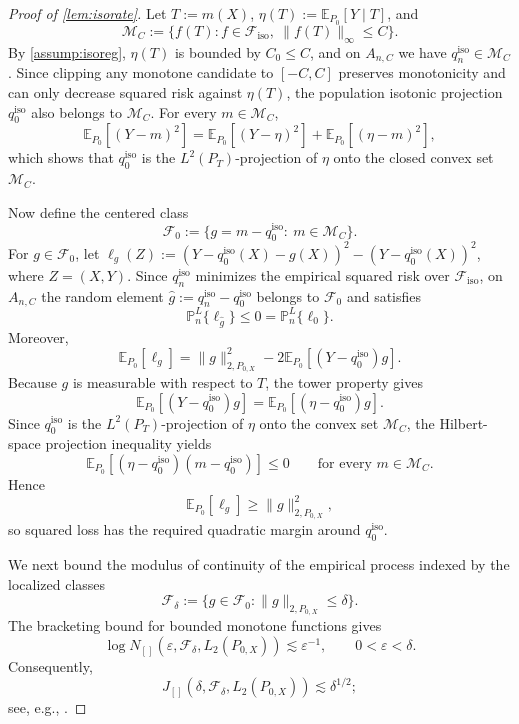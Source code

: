 \documentclass{article}
\theoremstyle{plain}
\theoremstyle{definition}
\newcommand{\E}{\mathbb{E}}
\newcommand{\1}{\mathbf{1}}
\newcommand{\mhat}{m}
\newcommand{\Pl}{\mathbb{P}^{L}_n}
\newcommand{\Px}{P_{0,X}}
\begin{document}
\begin{proof}[Proof of \cref{lem:isorate}]

Let \(T:=\mhat(X)\), \(\eta(T):=\E_{P_0}[Y\mid T]\), and
\[
\mathcal M_C:=\{f(T):f\in\mathcal F_{\mathrm{iso}},\ \|f(T)\|_\infty\le C\}.
\]
By \cref{assump:isoreg}, \(\eta(T)\) is bounded by \(C_0\le C\), and on \(A_{n,C}\) we have \(q_n^{\mathrm{iso}}\in\mathcal M_C\). Since clipping any monotone candidate to \([-C,C]\) preserves monotonicity and can only decrease squared risk against \(\eta(T)\), the population isotonic projection \(q_0^{\mathrm{iso}}\) also belongs to \(\mathcal M_C\). For every \(m\in\mathcal M_C\),
\[
\E_{P_0}[(Y-m)^2]
=
\E_{P_0}[(Y-\eta)^2]+\E_{P_0}[(\eta-m)^2],
\]
which shows that \(q_0^{\mathrm{iso}}\) is the \(L^2(P_T)\)-projection of \(\eta\) onto the closed convex set \(\mathcal M_C\).

Now define the centered class
\[
\mathcal F_0:=\{g=m-q_0^{\mathrm{iso}}:\ m\in\mathcal M_C\}.
\]
For \(g\in\mathcal F_0\), let \(\ell_g(Z):=(Y-q_0^{\mathrm{iso}}(X)-g(X))^2-(Y-q_0^{\mathrm{iso}}(X))^2\), where \(Z=(X,Y)\). Since \(q_n^{\mathrm{iso}}\) minimizes the empirical squared risk over \(\mathcal F_{\mathrm{iso}}\), on \(A_{n,C}\) the random element \(\hat g:=q_n^{\mathrm{iso}}-q_0^{\mathrm{iso}}\) belongs to \(\mathcal F_0\) and satisfies
\[
\Pl\{\ell_{\hat g}\}\le 0=\Pl\{\ell_0\}.
\]
Moreover,
\[
\E_{P_0}[\ell_g]
=
\|g\|_{2,\Px}^2-2\E_{P_0}[(Y-q_0^{\mathrm{iso}})g].
\]
Because \(g\) is measurable with respect to \(T\), the tower property gives
\[
\E_{P_0}[(Y-q_0^{\mathrm{iso}})g]
=
\E_{P_0}[(\eta-q_0^{\mathrm{iso}})g].
\]
Since \(q_0^{\mathrm{iso}}\) is the \(L^2(P_T)\)-projection of \(\eta\) onto the convex set \(\mathcal M_C\), the Hilbert-space projection inequality yields
\[
\E_{P_0}[(\eta-q_0^{\mathrm{iso}})(m-q_0^{\mathrm{iso}})]\le 0
\qquad\text{for every }m\in\mathcal M_C.
\]
Hence
\[
\E_{P_0}[\ell_g] \ge \|g\|_{2,\Px}^2,
\]
so squared loss has the required quadratic margin around \(q_0^{\mathrm{iso}}\).

We next bound the modulus of continuity of the empirical process indexed by the localized classes
\[
\mathcal F_\delta:=\{g\in\mathcal F_0:\|g\|_{2,\Px}\le \delta\}.
\]
The bracketing bound for bounded monotone functions gives
\[
\log N_{[]}(\varepsilon,\mathcal F_\delta,L_2(\Px))
\lesssim
\varepsilon^{-1},
\qquad 0<\varepsilon<\delta.
\]
Consequently,
\[
J_{[]}(\delta,\mathcal F_\delta,L_2(\Px))\lesssim \delta^{1/2};
\]
see, e.g., \citet{vdvwellner1996}.


\end{proof}
\end{document}
